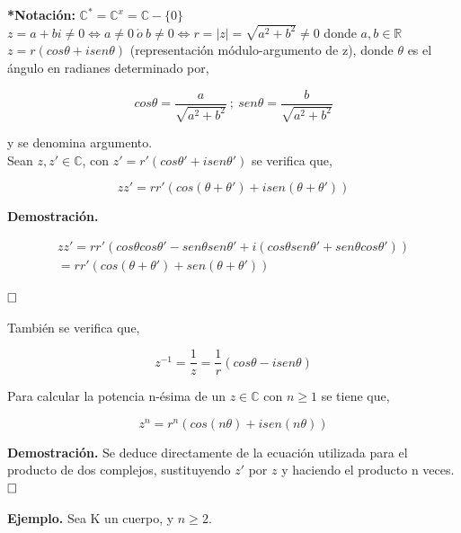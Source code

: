 \documentclass{article}
\begin{document}
\textbf{*Notación:} $\mathbb{C}^*=\mathbb{C}^x=\mathbb{C}-\{0\}$ \\

$z=a+bi \neq 0 \Leftrightarrow a \neq 0~\acute{o}~b \neq 0 \Leftrightarrow r=|z|=\sqrt{a^2+b^2}\neq 0$ donde $a,b \in \mathbb{R}$ \\

$z=r(cos\theta + i sen\theta)$ (representación módulo-argumento de z), donde $\theta$ es el ángulo en radianes determinado por,

\begin{equation*}
cos \theta = \frac{a}{\sqrt{a^2+b^2}}~;~sen \theta=\frac{b}{\sqrt{a^2+b^2}}
\end{equation*}

y se denomina argumento. \\

Sean $z,z'\in \mathbb{C}$, con $z'=r'(cos \theta' + i sen \theta')$ se verifica que,

\begin{equation*}
zz'=rr'(cos(\theta+\theta')+i sen(\theta+\theta'))
\end{equation*}

\textbf{Demostración.}

\begin{gather*}
zz'=rr'(cos \theta cos \theta' -sen \theta sen \theta' + i (cos \theta sen \theta' + sen \theta cos \theta')) \\
=rr'(cos(\theta+\theta')+sen(\theta+\theta'))
\end{gather*}

$\hfill\square$

También se verifica que,

\begin{equation*}
z^{-1}=\frac{1}{z}=\frac{1}{r}(cos \theta - i sen \theta)
\end{equation*}

Para calcular la potencia n-ésima de un $z \in \mathbb{C}$ con $n \geq 1$ se tiene que,

\begin{equation*}
z^n=r^n(cos(n\theta)+i sen(n\theta))
\end{equation*}

\textbf{Demostración.} Se deduce directamente de la ecuación utilizada para el producto de dos complejos, sustituyendo $z'$ por $z$ y haciendo el producto n veces. \\

$\hfill\square$

\textbf{Ejemplo.} Sea K un cuerpo, y $n\geq 2$. \\
\end{document}
